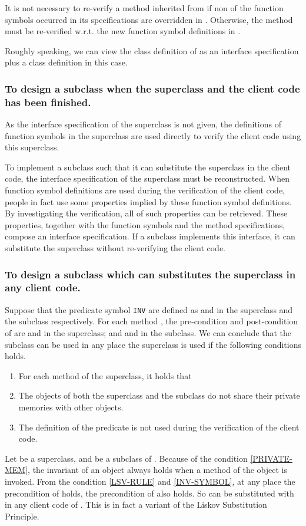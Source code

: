 \documentclass[fleqn]{llncs}
\begin{document}
It is not necessary to re-verify a method inherited from  if non of the function symbols occurred in its specifications are overridden in .
Otherwise, the method must be re-verified w.r.t. the new function symbol definitions in .

Roughly speaking, we can view the class definition of  as an interface specification plus a class definition in this case.



\subsubsection{To design a subclass when the superclass and the client code has been finished.}\label{SUBSUB-INHERITANCE-CLIENT-CODE-FIXED}
As the interface specification of the superclass is not given, the definitions of function symbols in the superclass are
used directly to verify the client code using this superclass.

To implement a subclass such that it can substitute the superclass in the client code, the interface specification of the superclass
must be reconstructed.
When function symbol definitions are used during the verification of the client code, people in fact use some properties
implied by these function symbol definitions. By investigating the verification, all of such properties
can be retrieved. These properties, together with the function symbols and the method specifications, compose an interface
specification. If a subclass implements this interface, it can substitute the superclass without re-verifying the client code.

\subsubsection{To design a subclass which can substitutes the superclass in any client code.}
Suppose that the predicate symbol \texttt{INV} are defined as  and  in the superclass and the subclass respectively.
For each method , the pre-condition and post-condition of 
are  and  in the superclass;
and  and  in the subclass.
We can conclude that the subclass can be used in any place the superclass is used if the following conditions holds.
\begin{enumerate}
\item \label{LSV-RULE}For each method  of the superclass, it holds that 
\item \label{PRIVATE-MEM}The objects of both the superclass and the subclass do not share their private memories with other objects.
\item \label{INV-SYMBOL}The definition of the predicate  is not used during the verification of the client code.
\end{enumerate}
Let  be a superclass, and  be a subclass of . Because of the condition \ref{PRIVATE-MEM}, the invariant of an object always holds
when a method of the object is invoked. From the condition \ref{LSV-RULE} and \ref{INV-SYMBOL}, at any place the precondition of  holds,
the precondition of  also holds. So  can be substituted with  in any client code of .
This is in fact a variant of the Liskov Substitution Principle.
\end{document}

